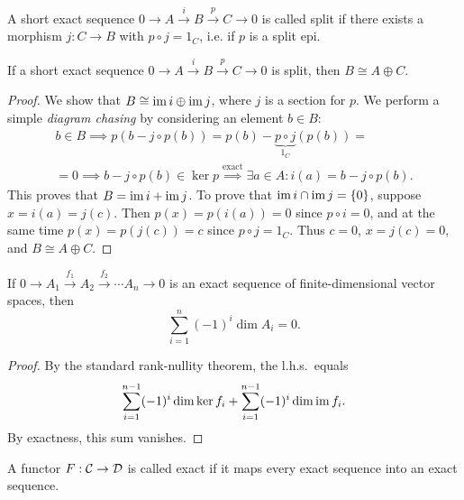\begin{defn}
    A short exact sequence $0\to A\overset i\to B\overset p \to C\to 0$ is called split if there exists a morphism $j:C\to B$ with $p\circ j=1_C$, i.e. if $p$ is a split epi.
\end{defn}

\begin{prop}
    If a short exact sequence $0\to A\overset i\to B\overset p \to C\to 0$ is split, then $B\cong A\oplus C$.
\end{prop}
\begin{proof}
    We show that $B\cong \operatorname{im} i\oplus \operatorname{im} j$, where $j$ is a section for $p$. We perform a simple \emph{diagram chasing} by considering an element $b\in B$:
    \begin{multline}
        b\in B\implies p(b-j\circ p(b))=p(b)-\underbrace{p\circ j}_{1_C}(p(b))=\\=0\implies b-j\circ p(b)\in\ker p\overset{\text{exact}}{\implies}\exists a\in A: i(a)=b-j\circ p(b).
    \end{multline}
    This proves that $B=\operatorname{im} i+\operatorname{im} j$. To prove that $\operatorname{im} i\cap \operatorname{im} j=\{0\}$, suppose $x=i(a)=j(c)$. Then $p(x)=p(i(a))=0$ since $p\circ i=0$, and at the same time $p(x)=p(j(c))=c$ since $p\circ j=1_C$. Thus $c=0$, $x=j(c)=0$, and $B\cong A\oplus C$.
\end{proof}

\begin{prop}\label{gen rank-nullity}
    If $0\to A_1\overset{f_1}\to A_2 \overset{f_2}\to\cdots A_n\to 0$ is an exact sequence of finite-dimensional vector spaces, then
    \[\sum_{i=1}^n(-1)^i \dim A_i=0.\]
\end{prop}
\begin{proof}
    By the standard rank-nullity theorem, the l.h.s.\ equals \[\sum_{i=1}^{n-1}(-1)^i\dim \ker f_i+\sum_{i=1}^{n-1}(-1)^i\dim \operatorname{im} f_i.\] By exactness, this sum vanishes.
\end{proof}


\begin{defn}
    A functor $F:\mathcal{C}\to\mathcal{D}$ is called exact if it maps every exact sequence into an exact sequence.
\end{defn}

